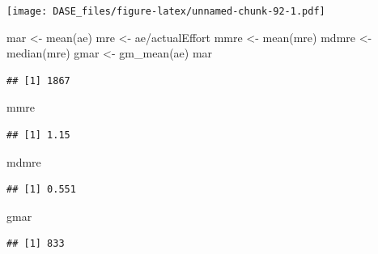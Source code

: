\documentclass[
]{book}
\newenvironment{Shaded}{\begin{snugshade}}{\end{snugshade}}
\newcommand{\FunctionTok}[1]{\textcolor[rgb]{0.00,0.00,0.00}{#1}}
\newcommand{\NormalTok}[1]{#1}
\newcommand{\OtherTok}[1]{\textcolor[rgb]{0.56,0.35,0.01}{#1}}
\newcommand{\SpecialCharTok}[1]{\textcolor[rgb]{0.00,0.00,0.00}{#1}}
\begin{document}
\texttt{[image: DASE\_files/figure-latex/unnamed-chunk-92-1.pdf]}

\begin{Shaded}
\begin{Highlighting}[]
\NormalTok{mar }\OtherTok{\textless{}{-}} \FunctionTok{mean}\NormalTok{(ae)}
\NormalTok{mre }\OtherTok{\textless{}{-}}\NormalTok{ ae}\SpecialCharTok{/}\NormalTok{actualEffort}
\NormalTok{mmre }\OtherTok{\textless{}{-}} \FunctionTok{mean}\NormalTok{(mre)}
\NormalTok{mdmre }\OtherTok{\textless{}{-}} \FunctionTok{median}\NormalTok{(mre)}
\NormalTok{gmar }\OtherTok{\textless{}{-}} \FunctionTok{gm\_mean}\NormalTok{(ae)}
\NormalTok{mar}
\end{Highlighting}
\end{Shaded}

\begin{verbatim}
## [1] 1867
\end{verbatim}

\begin{Shaded}
\begin{Highlighting}[]
\NormalTok{mmre}
\end{Highlighting}
\end{Shaded}

\begin{verbatim}
## [1] 1.15
\end{verbatim}

\begin{Shaded}
\begin{Highlighting}[]
\NormalTok{mdmre}
\end{Highlighting}
\end{Shaded}

\begin{verbatim}
## [1] 0.551
\end{verbatim}

\begin{Shaded}
\begin{Highlighting}[]
\NormalTok{gmar}
\end{Highlighting}
\end{Shaded}

\begin{verbatim}
## [1] 833
\end{verbatim}
\end{document}
